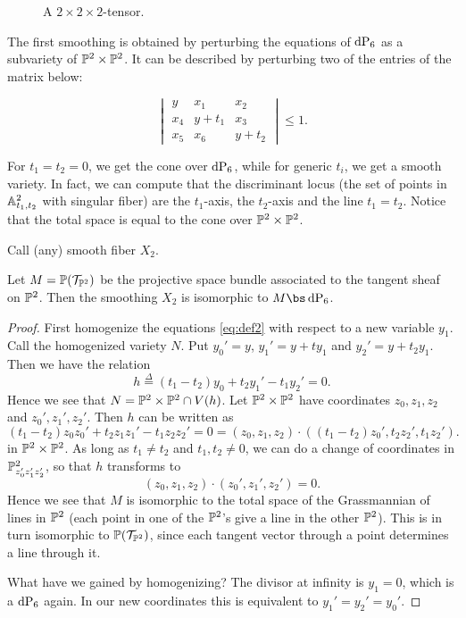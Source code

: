 \begin{figure}[b]
\centering

\caption{A $2 \times 2 \times 2$-tensor.}
\label{fig:p1p1p1_equations}
\end{figure}

The first smoothing is obtained by perturbing the equations of $\dP6$ as a subvariety of $\P^2 \times \P^2$.  It can be described by perturbing two of the entries of the matrix below:

\begin{equation}
\label{eq:def2}
\begin{vmatrix}
y & x_1 & x_2 \\
x_4 & y+t_1 & x_3 \\
x_5 & x_6 & y+t_2
\end{vmatrix} \leq 1.
\end{equation}


For $t_1=t_2=0$, we get the cone over $\dP6$, while for generic $t_i$, we get a smooth variety. In fact, we can compute that the discriminant locus (the set of points in $\A^2_{t_1,t_2}$ with singular fiber) are the $t_1$-axis, the $t_2$-axis and the line $t_1=t_2$. Notice that the total space is equal to the cone over $\P^2 \times \P^2$.

Call (any) smooth fiber $X_2$. 

\begin{lemma}
Let $M=\P(\mathcal T_ {\P^2})$ be the projective space bundle associated to the tangent sheaf on $\P^2$. Then the smoothing $X_2$ is isomorphic to $M \bs \dP6$. 
\end{lemma}
\begin{proof}
First homogenize the equations \eqref{eq:def2} with respect to a new variable $y_1$. Call the homogenized variety $N$. Put $y_0'=y$, $y_1' = y+ty_1$ and $y_2'=y+t_2y_1$. Then we have the relation
\[
h \stackrel{\Delta}= (t_1-t_2)y_0 +t_2 y_1' - t_1 y_2' = 0.
\]
Hence we see that $N=\P^2 \times \P^2 \cap V(h)$. Let $\P^2 \times \P^2$ have coordinates $z_0,z_1,z_2$ and $z_0',z_1',z_2'$. Then $h$ can be written as 
\[
(t_1-t_2) z_0z_0' + t_ 2 z_1 z_1' - t_1 z_2 z_2' = 0 = (z_0,z_1,z_2) \cdot \left( \left(t_1-t_2\right) z_0', t_2 z_2', t_1 z_2' \right).
\]
in $\P^2 \times \P^2$. As long as $t_1 \neq t_2$ and $t_1,t_2 \neq 0$, we can do a change of coordinates in $\P^2_{z_0'z_1'z_2'}$, so that $h$ transforms to
\[
(z_0,z_1,z_2) \cdot (z_0',z_1',z_2') = 0.
\]
Hence we see that $M$ is isomorphic to the total space of the Grassmannian of lines in $\P^2$ (each point in one of the $\P^2$'s give a line in the other $\P^2$). This is in turn isomorphic to $\P(\mathcal T_{\P^2})$, since each tangent vector through a point determines a line through it.

What have we gained by homogenizing? The divisor at infinity is $y_1=0$, which is a $\dP6$ again. In our new coordinates this is equivalent to $y_1'=y_2'=y_0'$.
\end{proof}

